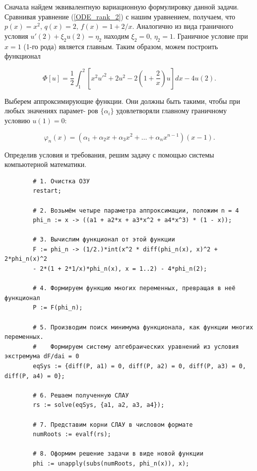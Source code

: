 \documentclass{article}
\begin{document}
Сначала найдем эквивалентную вариационную формулировку данной задачи. Сравнивая уравнение (\ref{ODE_rank_2}) с нашим уравнением, получаем, что $p(x) = x^{2}$, $q(x) = 2$, $f(x) = 1 + 2/x$. Аналогично из вида граничного условия $u'(2) + \xi_{2} u(2) = \eta_{2}$ находим $\xi_{2} = 0$, $\eta_{2} = 1$. Граничное условие при $x = 1$ (1-го рода) является главным. Таким образом, можем построить функционал

\begin{displaymath}
	\Phi[u] = \frac{1}{2} \int_{1}^{2} \left[ x^{2} u'^{2} + 2 u^{2} - 2 \left( 1 + \frac{2}{x} \right) u \right] dx - 4 u(2).
\end{displaymath}

Выберем аппроксимирующие функции. Они должны быть такими, чтобы при любых значениях парамет-
ров $\{\alpha_{i}\}$ удовлетворяли главному граничному условию $u(1) = 0$:

\begin{displaymath}
	\varphi_{n}(x) = (\alpha_{1} + \alpha_{2}x + \alpha_{3}x^{2} + \dots + \alpha_{n}x^{n-1}) (x-1).
\end{displaymath}

Определив условия и требования, решим задачу с помощью системы компьютерной математики.

\begin{commandline}
	\begin{verbatim}
		# 1. Очистка ОЗУ
		restart;		
		
		# 2. Возьмём четыре параметра аппроксимации, положим n = 4
		phi_n := x -> ((a1 + a2*x + a3*x^2 + a4*x^3) * (1 - x));	
		
		# 3. Вычислим функционал от этой функции
		F := phi_n -> (1/2.)*int(x^2 * diff(phi_n(x), x)^2 + 2*phi_n(x)^2
		- 2*(1 + 2*1/x)*phi_n(x), x = 1..2) - 4*phi_n(2);
		
		# 4. Формируем функцию многих переменных, превращая в неё функционал
		P := F(phi_n);	
		
		# 5. Производим поиск минимума функционала, как функции многих переменных.
		#    Формируем систему алгебраических уравнений из условия экстремума dF/dai = 0
		eqSys := {diff(P, a1) = 0, diff(P, a2) = 0, diff(P, a3) = 0, diff(P, a4) = 0};
		
		# 6. Решаем полученную СЛАУ
		rs := solve(eqSys, {a1, a2, a3, a4});
		
		# 7. Представим корни СЛАУ в числовом формате
		numRoots := evalf(rs);
		
		# 8. Оформим решение задачи в виде новой функции
		phi := unapply(subs(numRoots, phi_n(x)), x);
	\end{verbatim}
\end{commandline}
\end{document}
